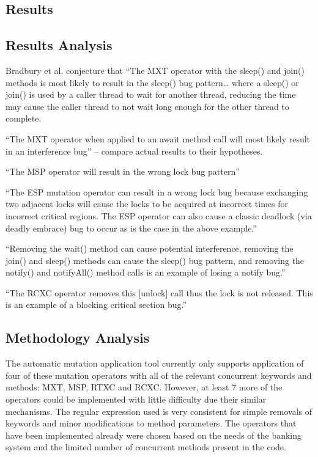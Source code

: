 \documentclass[a4paper,12pt]{article}
\begin{document}
    \subsection{Results}
    

\subsection{Results Analysis}

Bradbury et al. conjecture that “The MXT operator with the sleep() and join() methods is most likely to result in the sleep() bug pattern… where a sleep() or join() is used by a caller thread to wait for another thread, reducing the time may cause the caller thread to not wait long enough for the other thread to complete.  

“The MXT operator when applied to an await method call will most likely result in an interference bug” – compare actual results to their hypotheses.

“The MSP operator will result in the wrong lock bug pattern”

“The ESP mutation operator can result in a wrong lock bug because exchanging two adjacent locks will cause the locks to be acquired at incorrect times for incorrect critical regions. The ESP operator can also cause a classic deadlock (via deadly embrace) bug to occur as is the case in the above example.”

“Removing the wait() method can cause potential interference, removing the join() and sleep() methods can cause the sleep() bug pattern, and removing the notify() and notifyAll() method calls is an example of losing a notify bug.”

“The RCXC operator removes this [unlock] call thus the lock is not released. This is an example of a blocking critical section bug.”

    
    
    
    
\subsection{Methodology Analysis}

The automatic mutation application tool currently only supports application of four of these mutation operators with all of the relevant concurrent keywords and methods: MXT, MSP, RTXC and RCXC. However, at least 7 more of the operators could be implemented with little difficulty due their similar mechanisms. The regular expression used is very consistent for simple removals of keywords and minor modifications to method parameters. The operators that have been implemented already were chosen based on the needs of the banking system and the limited number of concurrent methods present in the code.   
\end{document}
